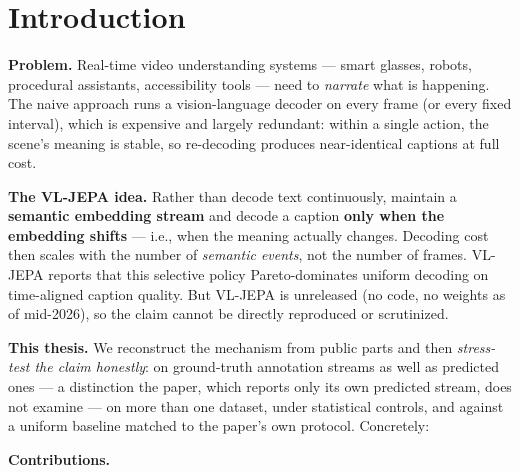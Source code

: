 \begin{abstract}
\medskip

\end{abstract}

\section{Introduction}

\textbf{Problem.} Real-time video understanding systems --- smart glasses, robots, procedural assistants, accessibility tools --- need to \emph{narrate} what is happening. The naive approach runs a vision-language decoder on every frame (or every fixed interval), which is expensive and largely redundant: within a single action, the scene's meaning is stable, so re-decoding produces near-identical captions at full cost.

\textbf{The VL-JEPA idea.} Rather than decode text continuously, maintain a \textbf{semantic embedding stream} and decode a caption \textbf{only when the embedding shifts} --- i.e., when the meaning actually changes. Decoding cost then scales with the number of \emph{semantic events}, not the number of frames. VL-JEPA reports that this selective policy Pareto-dominates uniform decoding on time-aligned caption quality. But VL-JEPA is unreleased (no code, no weights as of mid-2026), so the claim cannot be directly reproduced or scrutinized.

\textbf{This thesis.} We reconstruct the mechanism from public parts and then \emph{stress-test the claim honestly}: on ground-truth annotation streams as well as predicted ones --- a distinction the paper, which reports only its own predicted stream, does not examine --- on more than one dataset, under statistical controls, and against a uniform baseline matched to the paper's own protocol. Concretely:

\textbf{Contributions.}

